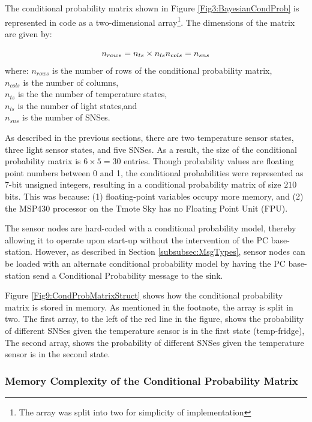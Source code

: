 \documentclass{sig-alternate-10pt}
\begin{document}
The conditional probability matrix shown in Figure \ref{Fig3:BayesianCondProb}
is represented in code as a two-dimensional array\footnote{The array was split into two for simplicity of implementation}. The dimensions of the matrix are given by:

\begin{equation}
n_{rows} = n_{ts} \times n_{ls} \\
n_{cols} = n_{sns}
\end{equation}
\noindent
where:
$n_{rows}$ is the number of rows of the conditional probability matrix,\\
\noindent
$n_{cols}$ is the number of columns,\\
\noindent
$n_{ts}$ is the the number of temperature states,\\
\noindent
$n_{ls}$ is the number of light states,and\\
\noindent
$n_{sns}$ is the number of SNSes.

As described in the previous sections, there are two temperature sensor states,
three light sensor states, and five SNSes. As a result, the size of the
conditional probability matrix is $6 \times 5 = 30$ entries. Though probability
values are floating point numbers between 0 and 1, the conditional
probabilities were represented as 7-bit unsigned integers, resulting in a 
conditional probability matrix of size $210$ bits. This was because: (1) 
floating-point variables occupy more memory, and (2) the MSP430 processor on 
the Tmote Sky has no Floating Point Unit (FPU).

The sensor nodes are hard-coded with a conditional probability model, thereby 
allowing it to operate upon start-up without the intervention of the PC 
base-station. However, as described in Section \ref{subsubsec:MsgTypes}, sensor 
nodes can be loaded with an alternate conditional probability model by having 
the PC base-station send a Conditional Probability message to the sink.

Figure \ref{Fig9:CondProbMatrixStruct} shows how the conditional probability 
matrix is stored in memory. As mentioned in the footnote, the array is split in 
two. The first array, to the left of the red line in the figure, shows the 
probability of different SNSes given the temperature sensor is in the first 
state (temp-fridge), The second array, shows the probability of different SNSes 
given the temperature sensor is in the second state.

\subsubsection{Memory Complexity of the Conditional Probability Matrix} \label{subsubsec:CPMMemComplexity}
\end{document}
